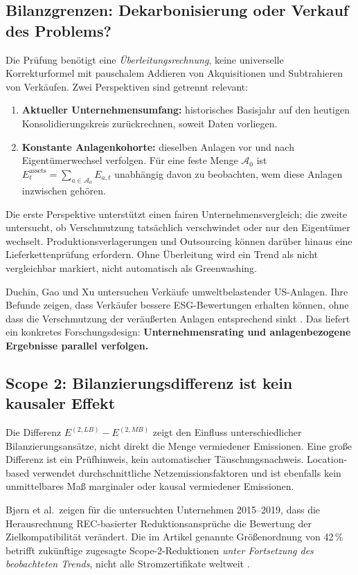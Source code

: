 \documentclass[11pt,a4paper]{article}
\begin{document}
\subsection{Bilanzgrenzen: Dekarbonisierung oder Verkauf des Problems?}
Die Prüfung benötigt eine \emph{Überleitungsrechnung}, keine universelle Korrekturformel mit pauschalem Addieren von Akquisitionen und Subtrahieren von Verkäufen. Zwei Perspektiven sind getrennt relevant:
\begin{enumerate}
\item \textbf{Aktueller Unternehmensumfang:} historisches Basisjahr auf den heutigen Konsolidierungskreis zurückrechnen, soweit Daten vorliegen.
\item \textbf{Konstante Anlagenkohorte:} dieselben Anlagen vor und nach Eigentümerwechsel verfolgen. Für eine feste Menge $\mathcal A_0$ ist $E^{\mathrm{assets}}_t=\sum_{a\in\mathcal A_0}E_{a,t}$ unabhängig davon zu beobachten, wem diese Anlagen inzwischen gehören.
\end{enumerate}
Die erste Perspektive unterstützt einen fairen Unternehmensvergleich; die zweite untersucht, ob Verschmutzung tatsächlich verschwindet oder nur den Eigentümer wechselt. Produktionsverlagerungen und Outsourcing können darüber hinaus eine Lieferkettenprüfung erfordern. Ohne Überleitung wird ein Trend als \glqq nicht vergleichbar\grqq{} markiert, nicht automatisch als Greenwashing.

Duchin, Gao und Xu untersuchen Verkäufe umweltbelastender US-Anlagen. Ihre Befunde zeigen, dass Verkäufer bessere ESG-Bewertungen erhalten können, ohne dass die Verschmutzung der veräußerten Anlagen entsprechend sinkt \cite{duchin2025}. Das liefert ein konkretes Forschungsdesign: \textbf{Unternehmensrating und anlagenbezogene Ergebnisse parallel verfolgen.}

\subsection{Scope 2: Bilanzierungsdifferenz ist kein kausaler Effekt}
Die Differenz $E^{(2,LB)}-E^{(2,MB)}$ zeigt den Einfluss unterschiedlicher Bilanzierungsansätze, nicht direkt die Menge vermiedener Emissionen. Eine große Differenz ist ein Prüfhinweis, kein automatischer Täuschungsnachweis. Location-based verwendet durchschnittliche Netzemissionsfaktoren und ist ebenfalls kein unmittelbares Maß marginaler oder kausal vermiedener Emissionen.

Bjørn et al.\ zeigen für die untersuchten Unternehmen 2015--2019, dass die Herausrechnung REC-basierter Reduktionsansprüche die Bewertung der Zielkompatibilität verändert. Die im Artikel genannte Größenordnung von 42\,\% betrifft zukünftige zugesagte Scope-2-Reduktionen \emph{unter Fortsetzung des beobachteten Trends}, nicht alle Stromzertifikate weltweit \cite{bjorn2022}.
\end{document}
